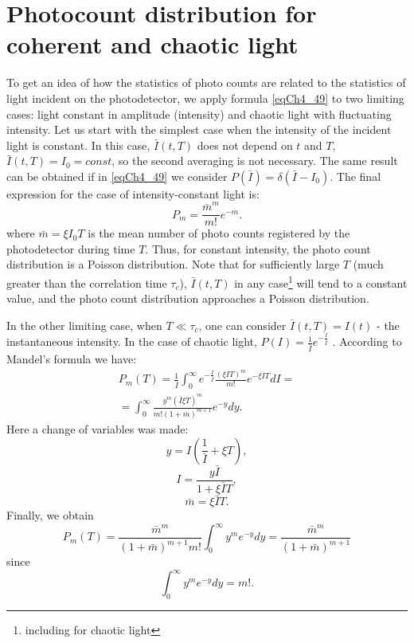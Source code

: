 \section{Photocount distribution for coherent and chaotic
  light}
To get an idea of how the statistics of photo counts are related to the statistics of light incident on the photodetector,
we apply formula \eqref{eqCh4_49} to two limiting cases:
light constant in amplitude (intensity) and chaotic light with
fluctuating
intensity. Let us start with the simplest case when the intensity of the incident
light is constant. In this case, $\bar{I}\left(t, T\right)$ does not depend
on $t$ and $T$, $\bar{I}\left(t, T\right) = I_0 = const$,  so
the second averaging is not necessary. The same result can be obtained if in
\eqref{eqCh4_49} we consider $P\left(\bar{I}\right) =
\delta\left(\bar{I} - I_0\right)$.  The final expression for the case
of intensity-constant light is:
\begin{equation}
P_m = \frac{\bar{m}^m}{m!}e^{- \bar{m}}.
\label{eqCh4_50}
\end{equation}
where $\bar{m} = \xi I_0 T$ is the mean number of photo counts registered
by the photodetector during time $T$.  Thus, for constant
intensity, the photo count distribution is a Poisson distribution. 
Note that for sufficiently large $T$ (much greater than
the correlation time $\tau_c$), $\bar{I}\left(t, T\right)$ in any case\footnote{including for chaotic light} will tend to
a constant value, and the photo count distribution approaches a Poisson distribution. 

In the other limiting case, when $T \ll \tau_c$, one can consider
$\bar{I}\left(t, T\right) = I\left(t\right)$ - the instantaneous
intensity. In the case of chaotic light, $P\left(I\right) =
\frac{1}{\bar{I}} e^{- \frac{I}{\bar{I}}}$ \cite{bLoudon1976}.
According to Mandel's formula we have:
\begin{eqnarray}
P_m\left(T\right) = \frac{1}{\bar{I}}\int_0^{\infty} e^{- \frac{I}{\bar{I}}}
\frac{\left(\xi I T\right)^m}{m!} e^{-
  \xi I T} d I = 
\nonumber \\
= \int_0^{\infty} \frac{y^m\left(\bar{I} \xi
  T\right)^m}{m!\left(1 + \bar{m}\right)^{m + 1}} e^{-y} dy.
\label{eqCh4_51}
\end{eqnarray}
Here a change of variables was made:
\[
y = I \left(\frac{1}{\bar{I}} + \xi T\right),
\]
\[
I = \frac{y \bar{I}}{1 + \xi \bar{I} T},
\]
\[
\bar{m} = \xi \bar{I} T.
\]
Finally, we obtain
\begin{equation}
P_m\left(T\right) = 
\frac{\bar{m}^m}{\left(1 + \bar{m}\right)^{m + 1} m!}
\int_0^{\infty}y^m e^{-y}dy = 
\frac{\bar{m}^m}{\left(1 + \bar{m}\right)^{m + 1}}
\label{eqCh4_52}
\end{equation}
since
\[
\int_0^{\infty}y^m e^{-y}dy = m!.
\]

